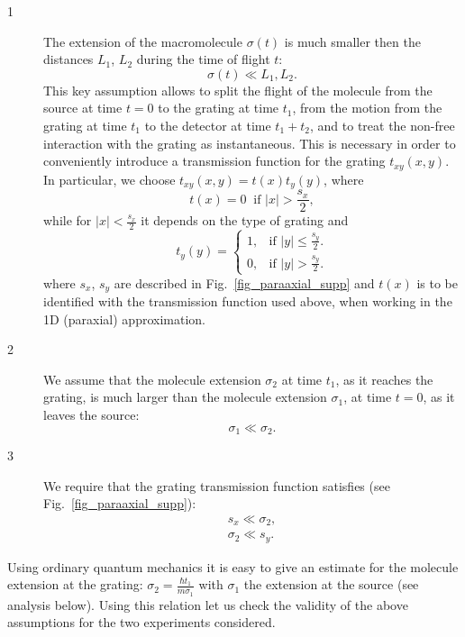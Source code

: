 \documentclass[12pt,groupedaddress,pra,aps]{revtex4-1}
\begin{document}
\begin{description}
\item[1]
The extension of the macromolecule $\sigma(t)$ is much smaller then the distances $L_1$, $L_2$ during the time of flight $t$: 
\begin{equation}
\sigma(t) \ll L_1,L_2.
\end{equation}
This key assumption allows to split the flight of the molecule from the source at time $t=0$ to the grating at time $t_1$, from the motion from the grating at time $t_1$ to the detector at time $t_1+t_2$, and to treat the non-free interaction with the grating as  instantaneous. This is necessary in order to conveniently  introduce a transmission function for the grating $t_{xy}(x,y)$. In particular, we choose $t_{xy}(x,y)=t(x)t_y(y)$, where
\begin{equation}\label{txx}
t(x)=0 \;\;\text{if $|x| > \frac{s_x}{2}$},
\end{equation}
while for $|x| < \frac{s_x}{2}$ it depends on the type of grating and
\begin{equation}\label{tyy}
t_y(y)=\begin{cases}
    1, & \text{if $|y| \leq \frac{s_y}{2}$}.\\
    0, & \text{if $|y| > \frac{s_y}{2}$}.
  \end{cases}
\end{equation}
where $s_x$, $s_y$ are described in Fig.~\ref{fig_paraaxial_supp} and $t(x)$ is to be identified with the transmission function used above, when working in the 1D (paraxial) approximation.

\item[2]
We assume that the molecule extension $\sigma_2$ at time $t_1$, as it reaches the grating, is much larger than the molecule extension $\sigma_1$, at time $t=0$, as it leaves the source:
\begin{equation}\label{2nd2}
\sigma_1 \ll \sigma_2.
\end{equation}
\item[3]
We require that the grating transmission function satisfies (see Fig.~\ref{fig_paraaxial_supp}):
\begin{align}
s_x \ll \sigma_2, \label{sxassumption1}\\
\sigma_2 \ll s_y.\label{syassumption1}
\end{align}
\end{description}

Using ordinary quantum mechanics it is easy to give an estimate for the molecule extension at the grating: $\sigma_2=\frac{\hbar t_1}{m \sigma_1}$ with $\sigma_1$ the extension at the source (see analysis below). Using this relation let us check the validity of the above assumptions for the two experiments considered. 
\end{document}
